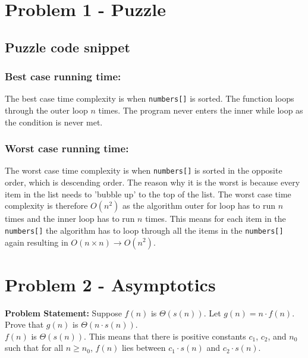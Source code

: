 \chapter{Problem 1 - Puzzle}

    \section{Puzzle code snippet}
     
    \vspace*{\baselineskip}

    \small\subsection*{Best case running time:}
    The best case time complexity is when \texttt{numbers[]} is sorted. The function loops through the outer loop $n$ times. The program never enters the inner while loop as the condition is never met.
    \small\subsection*{Worst case running time:}
    The worst case time complexity is when \texttt{numbers[]} is sorted in the opposite order, which is descending order. The reason why it is the worst is because every item in the list needs to 'bubble up' to the top of the list. The worst case time complexity is therefore $O(n^2)$ as the algorithm outer for loop has to run $n$ times and the inner loop has to run $n$ times. This means for each item in the \texttt{numbers[]} the algorithm has to loop through all the items in the \texttt{numbers[]} again resulting in $O(n \times n) \rightarrow O(n^2)$.



\chapter{Problem 2 - Asymptotics}

\textbf{Problem Statement: }Suppose $f(n)$ is $\Theta(s(n))$. Let $g(n) = n \cdot f(n)$. Prove that $g(n)$ is $\Theta(n \cdot s(n))$.\\

$f(n)$ is $\Theta(s(n))$. This means that there is positive constants $c_1$, $c_2$, and $n_0$ such that for all $n \geq n_0$, $f(n)$ lies between $c_1 \cdot s(n)$ and $c_2 \cdot s(n)$.
    \\

